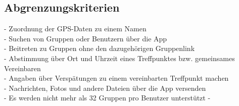 \subsection{Abgrenzungskriterien}
- 	Zuordnung der GPS-Daten zu einem Namen\\
- 	Suchen von Gruppen oder Benutzern über die App\\
-	Beitreten zu Gruppen ohne den dazugehörigen Gruppenlink\\
-	Abstimmung über Ort und Uhrzeit eines Treffpunktes bzw. gemeinsames Vereinbaren\\
-	Angaben über Verspätungen zu einem vereinbarten Treffpunkt machen\\
- 	Nachrichten, Fotos und andere Dateien über die App versenden \\
-	Es werden nicht mehr als 32 Gruppen pro Benutzer unterstützt
-



